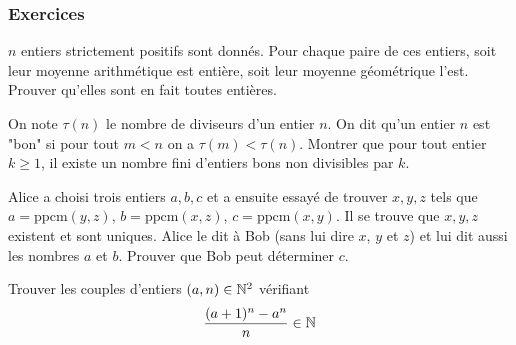 
\subsubsection{Exercices}

\begin{exo}%
$n$ entiers strictement positifs sont donnés. Pour chaque paire de ces entiers, soit leur moyenne arithmétique est entière, soit leur moyenne géométrique l'est. Prouver qu'elles sont en fait toutes entières.
\end{exo}




\begin{exo}
On note $\tau(n)$ le nombre de diviseurs d'un entier $n$. On dit qu'un entier $n$ est "bon" si pour tout $m < n$ on a $\tau(m) < \tau(n)$. Montrer que pour tout entier $k\ge 1$, il existe un nombre fini d'entiers bons non divisibles par $k$.
\end{exo}


\begin{exo}
Alice a choisi trois entiers $a, b, c$ et a ensuite essayé de trouver $x, y, z$ tels que $a = \mathrm{ppcm} (y, z)$, $b = \mathrm{ppcm}(x, z)$, $c = \mathrm{ppcm}(x, y)$. Il se trouve que $x, y, z$ existent et sont uniques. Alice le dit à Bob (sans lui dire $x$, $y$ et $z$) et lui dit aussi les nombres $a$ et $b$. Prouver que Bob peut déterminer $c$.
\end{exo}


\begin{exo}
Trouver les couples d'entiers $(a, n)\in \mathbb N^2$ vérifiant
$$\frac{(a + 1)^n - a^n }{n}\in \mathbb N$$
\end{exo}


